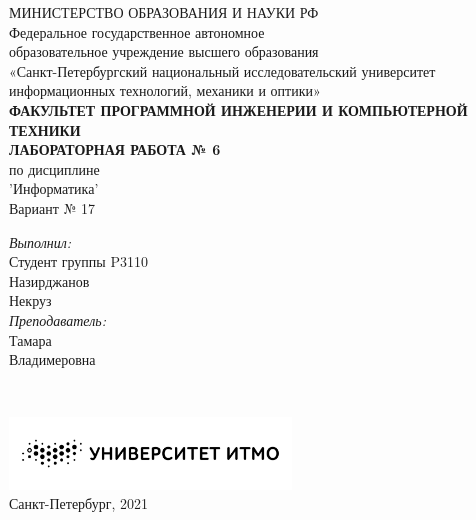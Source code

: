 {\centering
МИНИСТЕРСТВО ОБРАЗОВАНИЯ И НАУКИ РФ \\
\vspace{0.6cm}
Федеральное государственное автономное \\
образовательное учреждение высшего образования \\
«Санкт-Петербургский национальный исследовательский университет \\
 информационных технологий, механики и оптики» \\
\vspace{0.6cm}
\footnotesize{\textbf{ФАКУЛЬТЕТ ПРОГРАММНОЙ ИНЖЕНЕРИИ И КОМПЬЮТЕРНОЙ ТЕХНИКИ}} \\
\vspace{3.2cm}
\Large{\textbf{ЛАБОРАТОРНАЯ РАБОТА № 6}} \\
\large{по дисциплине} \\
\Large{'Информатика'} \\
\vspace{1cm}
\Large{Вариант № 17} \\
\vspace{9cm}
\begin{minipage}{\linewidth}
\raggedleft
\normalsize
\textsl{Выполнил:} \\
Студент группы P3110 \\
Назирджанов \\ Некруз \\
\textsl{Преподаватель:} \\
Тамара \\ Владимеровна
\end{minipage} \\
\vspace{2cm}
\begin{minipage}{\linewidth}
\centering
\includegraphics[width=7.5cm]{images/logo.png} \\
\normalsize{Санкт-Петербург, 2021} \\
\end{minipage} \\}